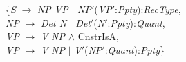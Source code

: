 \begin{description}
  \begin{tabbing}
    \{\=\textit{S} $\longrightarrow$ \textit{NP VP} $\mid$ \textit{NP}$'$(\textit{VP}$'$:\textit{Ppty}):\textit{RecType},\\
    \>\textit{NP} $\longrightarrow$ \textit{Det N} $\mid$
    \textit{Det}$'$(\textit{N}$'$:\textit{Ppty}):\textit{Quant},\\
    \>\textit{VP} $\longrightarrow$ \textit{V} \textit{NP}
    \d{\d{$\wedge$}} CnstrIsA, \\
    \>\textit{VP} $\longrightarrow$ \textit{V} \textit{NP} $\mid$
    \textit{V}$'$(\textit{NP}$'$:\textit{Quant}):\textit{Ppty}\}

  \end{tabbing}

\end{description}
  








 
 
 
   
